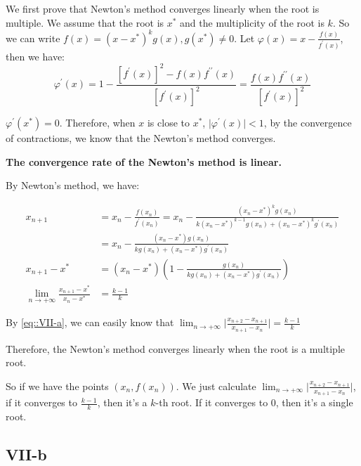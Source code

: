 \documentclass[a4paper]{article}
\begin{document}
We first prove that Newton's method converges linearly when the root is multiple. We assume that the root is $x^*$ and the multiplicity of the root is $k$. So we can write $f(x) = (x-x^*)^k g(x), g(x^*) \ne 0$. Let $\varphi(x) = x - \frac{f(x)}{f^\prime(x)}$, then we have:
\begin{equation}
  \varphi^\prime (x) = 1 - \frac{[f^\prime (x)]^2 - f(x)f^{\prime \prime}(x)}{[f^\prime (x)]^2} = \frac{f(x)f^{\prime \prime}(x)}{[f^\prime (x)]^2}
\end{equation}

$\varphi^\prime (x^*) = 0$. Therefore, when $x$ is close to $x^*$, $\vert \varphi^\prime (x) \vert < 1$, by the convergence of contractions, we know that the Newton's method converges. 

\textbf{The convergence rate of the Newton's method is linear.}

By Newton's method, we have:

\begin{equation}
  \begin{aligned}
    x_{n+1} &= x_n - \frac{f(x_n)}{f^\prime(x_n)} = x_n - \frac{(x_n-x^*)^k g(x_n)}{k(x_n-x^*)^{k-1}g(x_n) + (x_n-x^*)^k g^\prime(x_n)}\\
    &= x_n - \frac{(x_n-x^*) g(x_n)}{k g(x_n) + (x_n-x^*) g^\prime(x_n)} \\ 
    x_{n+1} - x^* &= (x_n - x^*) (1 - \frac{g(x_n)}{k g(x_n) + (x_n-x^*) g^\prime(x_n)}) \\ 
    \lim_{n \rightarrow +\infty}\frac{x_{n+1} - x^*}{x_n - x^*} &= \frac{k-1}{k}
  \end{aligned}
  \label{eq::VII-a}
\end{equation}

By \ref{eq::VII-a}, we can easily know that $\lim_{n \rightarrow +\infty}\vert \frac{x_{n+2} - x_{n+1}}{x_{n+1} - x_{n}} \vert = \frac{k-1}{k}$

Therefore, the Newton's method converges linearly when the root is a multiple root. 

So if we have the points $(x_n, f(x_n))$. We just calculate $\lim_{n \rightarrow +\infty}\vert \frac{x_{n+2} - x_{n+1}}{x_{n+1} - x_{n}} \vert$, if it converges to $\frac{k-1}{k}$, then it's a $k$-th root. If it converges to 0, then it's a single root. 

\subsection*{VII-b}
\end{document}
